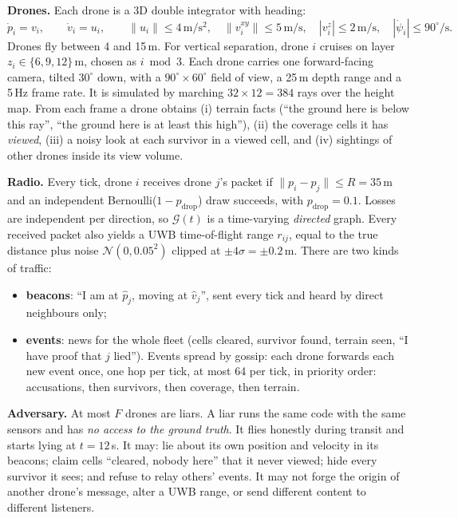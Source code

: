 \textbf{Drones.} Each drone is a 3D double integrator with heading:
\begin{equation}
    \dot p_i = v_i,\qquad \dot v_i = u_i,\qquad \|u_i\|\le 4\,\mathrm{m/s^2},\quad \|v_i^{xy}\|\le 5\,\mathrm{m/s},
    \quad |v_i^{z}|\le 2\,\mathrm{m/s},\quad |\dot\psi_i|\le 90^\circ\!/\mathrm{s}.
    \label{eq:dynamics}
\end{equation}
Drones fly between 4 and 15\,m. For vertical separation, drone $i$ cruises on layer $z_i\in\{6,9,12\}$\,m, chosen as
$i \bmod 3$. Each drone carries one forward-facing camera, tilted $30^\circ$ down, with a $90^\circ\times60^\circ$ field
of view, a 25\,m depth range and a 5\,Hz frame rate. It is simulated by marching $32\times12=384$ rays over the height
map. From each frame a drone obtains (i) terrain facts (``the ground here is below this ray'', ``the ground here is at
least this high''), (ii) the coverage cells it has \emph{viewed}, (iii) a noisy look at each survivor in a viewed cell,
and (iv) sightings of other drones inside its view volume.

\textbf{Radio.} Every tick, drone $i$ receives drone $j$'s packet if $\|p_i-p_j\|\le R=35$\,m and an independent
Bernoulli($1-p_{\mathrm{drop}}$) draw succeeds, with $p_{\mathrm{drop}}=0.1$. Losses are independent per direction, so
$\mathcal{G}(t)$ is a time-varying \emph{directed} graph. Every received packet also yields a UWB time-of-flight range
$r_{ij}$, equal to the true distance plus noise $\mathcal{N}(0,0.05^2)$ clipped at $\pm4\sigma=\pm0.2$\,m. There are
two kinds of traffic:
\begin{itemize}
    \item \textbf{beacons}: ``I am at $\hat p_j$, moving at $\hat v_j$'', sent every tick and heard by direct
          neighbours only;
    \item \textbf{events}: news for the whole fleet (cells cleared, survivor found, terrain seen, ``I have proof that
          $j$ lied''). Events spread by gossip: each drone forwards each new event once, one hop per tick, at most 64
          per tick, in priority order: accusations, then survivors, then coverage, then terrain.
\end{itemize}

\textbf{Adversary.} At most $F$ drones are liars. A liar runs the same code with the same sensors and has \emph{no access
to the ground truth}. It flies honestly during transit and starts lying at $t=12$\,s. It may: lie about its own
position and velocity in its beacons; claim cells ``cleared, nobody here'' that it never viewed; hide every survivor it
sees; and refuse to relay others' events. It may not forge the origin of another drone's message, alter a UWB range,
or send different content to different listeners.

